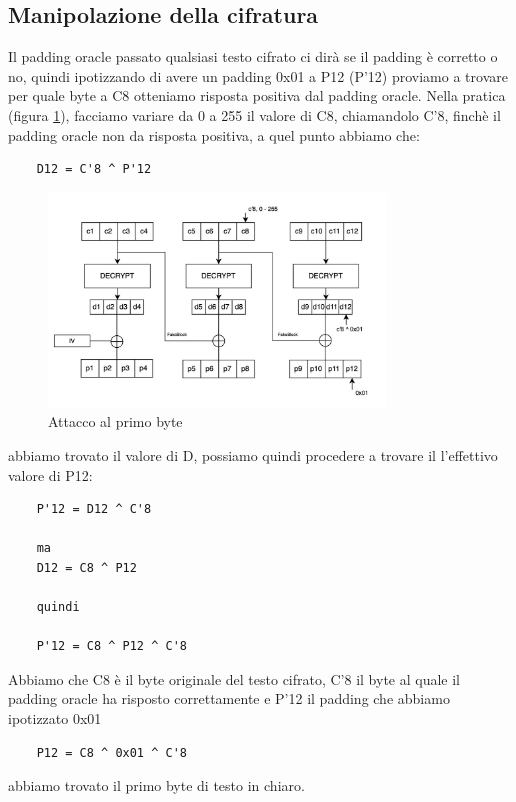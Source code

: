 \subsection{Manipolazione della cifratura}
Il padding oracle passato qualsiasi testo cifrato ci dirà se il padding è corretto o no, quindi ipotizzando di avere un padding 0x01 a P12 (P'12)
proviamo a trovare per quale byte a C8 otteniamo risposta positiva dal padding oracle.
Nella pratica (figura \ref{fig:attack_2}), facciamo variare da 0 a 255 il valore di C8, chiamandolo C'8, finchè il padding 
oracle non da risposta positiva, a quel punto abbiamo che:
\begin{verbatim}
    D12 = C'8 ^ P'12 
 \end{verbatim}
 \begin{figure}[h!]
    \includegraphics[width=0.8\textwidth]{img/attack_first_byte.jpeg}
    \centering
    \caption{Attacco al primo byte}
    \label{fig:attack_2}
\end{figure}
abbiamo trovato il valore di D, possiamo quindi procedere a trovare il l'effettivo valore di P12:
 \begin{verbatim}
    P'12 = D12 ^ C'8

    ma
    D12 = C8 ^ P12

    quindi

    P'12 = C8 ^ P12 ^ C'8
 \end{verbatim}
 Abbiamo che C8 è il byte originale del testo cifrato, C'8 il byte al quale il padding oracle ha risposto correttamente e P'12 il padding che abbiamo ipotizzato 0x01
 \begin{verbatim}
    P12 = C8 ^ 0x01 ^ C'8
 \end{verbatim}
abbiamo trovato il primo byte di testo in chiaro.
